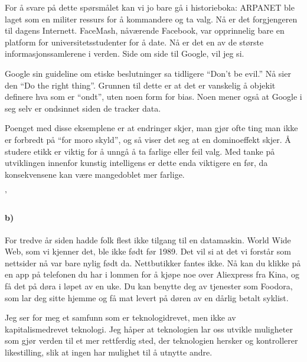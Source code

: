 \documentclass{../../myassignment}
\begin{document}
	\begin{answer}
		For å svare på dette spørsmålet kan vi jo bare gå i historieboka: ARPANET ble laget som en militer ressurs for å kommandere og ta valg. Nå er det forgjengeren til dagens Internett. FaceMash, nåværende Facebook, var opprinnelig bare en platform for universitetsstudenter for å date. Nå er det en av de største informasjonssamlerene i verden. Side om side til Google, vil jeg si. 

		Google sin guideline om etiske beslutninger sa tidligere ``Don't be evil.'' Nå sier den ``Do the right thing''. Grunnen til dette er at det er vanskelig å objekit definere hva som er ``ondt'', uten noen form for bias. Noen mener også at Google i seg selv er ondsinnet siden de tracker data.

		Poenget med disse eksemplene er at endringer skjer, man gjør ofte ting man ikke er forbredt på ``for moro skyld'', og så viser det seg at en dominoeffekt skjer. Å studere etikk er viktig for å unngå å ta farlige eller feil valg. Med tanke på utviklingen innenfor kunstig intelligens er dette enda viktigere en før, da konsekvensene kan være mangedoblet mer farlige.

	\end{answer}'

	\paragraph*{b)}
	\begin{answer}
		For tredve år siden hadde folk flest ikke tilgang til en datamaskin. World Wide Web, som vi kjenner det, ble ikke født før 1989. Det vil si at det vi forstår som nettsider nå var bare nylig født da. Nettbutikker fantes ikke. Nå kan du klikke på en app på telefonen du har i lommen for å kjøpe noe over Aliexpress fra Kina, og få det på døra i løpet av en uke. Du kan benytte deg av tjenester som Foodora, som lar deg sitte hjemme og få mat levert på døren av en dårlig betalt syklist.

		Jeg ser for meg et samfunn som er teknologidrevet, men ikke av kapitalismedrevet teknologi. Jeg håper at teknologien lar oss utvikle muligheter som gjør verden til et mer rettferdig sted, der teknologien hersker og kontrollerer likestilling, slik at ingen har mulighet til å utnytte andre.

	\end{answer}
\end{document}
